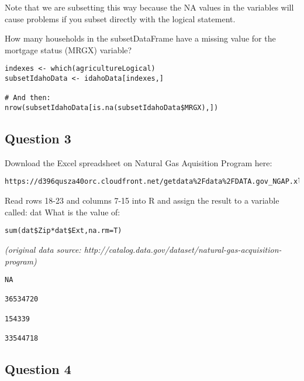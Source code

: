 \documentclass[]{article}
\begin{document}
\noindent Note that we are subsetting this way because the NA values in the variables 
will cause problems if you subset directly with the logical statement. 


\noindent How many households in the subsetDataFrame have a missing value for the mortgage status 
(MRGX) variable?

\begin{framed} 
\begin{verbatim}
indexes <- which(agricultureLogical)
subsetIdahoData <- idahoData[indexes,]

# And then:
nrow(subsetIdahoData[is.na(subsetIdahoData$MRGX),])
\end{verbatim}
\end{framed} 


\newpage
\subsection*{Question 3}

Download the Excel spreadsheet on Natural Gas Aquisition Program here: 

\begin{verbatim}
https://d396qusza40orc.cloudfront.net/getdata%2Fdata%2FDATA.gov_NGAP.xlsx 
\end{verbatim}

Read rows 18-23 and columns 7-15 into R and assign the result to a variable called:  dat  What is the value of:  
\begin{framed}
\begin{verbatim}
sum(dat$Zip*dat$Ext,na.rm=T)  
\end{verbatim}
\end{framed}


\textit{(original data source: http://catalog.data.gov/dataset/natural-gas-acquisition-program)}

\begin{verbatim} 
NA 

36534720 

154339 

33544718 
\end{verbatim} 



\newpage
\subsection*{Question 4}
\end{document}

